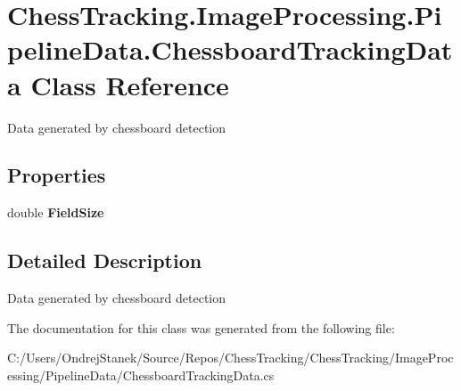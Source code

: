 \hypertarget{class_chess_tracking_1_1_image_processing_1_1_pipeline_data_1_1_chessboard_tracking_data}{}\section{Chess\+Tracking.\+Image\+Processing.\+Pipeline\+Data.\+Chessboard\+Tracking\+Data Class Reference}
\label{class_chess_tracking_1_1_image_processing_1_1_pipeline_data_1_1_chessboard_tracking_data}


Data generated by chessboard detection  


\subsection*{Properties}
\begin{DoxyCompactItemize}
\item 
\mbox{\label{class_chess_tracking_1_1_image_processing_1_1_pipeline_data_1_1_chessboard_tracking_data_aac06eba8cfcf464d66edf22a874bea35}} 
double {\bfseries Field\+Size}
\end{DoxyCompactItemize}


\subsection{Detailed Description}
Data generated by chessboard detection 



The documentation for this class was generated from the following file\+:\begin{DoxyCompactItemize}
\item 
C\+:/\+Users/\+Ondrej\+Stanek/\+Source/\+Repos/\+Chess\+Tracking/\+Chess\+Tracking/\+Image\+Processing/\+Pipeline\+Data/Chessboard\+Tracking\+Data.\+cs\end{DoxyCompactItemize}
